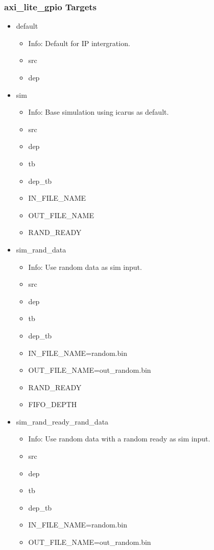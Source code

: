 \subsubsection{axi\_lite\_gpio Targets}
\begin{itemize}
\item default
	\begin{itemize}
	\item[$\space$] Info: Default for IP intergration.
	\item src
	\item dep
	\end{itemize}
\item sim
	\begin{itemize}
	\item[$\space$] Info: Base simulation using icarus as default.
	\item src
	\item dep
	\item tb
	\item dep\_tb
	\item IN\_FILE\_NAME
	\item OUT\_FILE\_NAME
	\item RAND\_READY
	\end{itemize}
\item sim\_rand\_data
	\begin{itemize}
	\item[$\space$] Info: Use random data as sim input.
	\item src
	\item dep
	\item tb
	\item dep\_tb
	\item IN\_FILE\_NAME=random.bin
	\item OUT\_FILE\_NAME=out\_random.bin
	\item RAND\_READY
	\item FIFO\_DEPTH
	\end{itemize}
\item sim\_rand\_ready\_rand\_data
	\begin{itemize}
	\item[$\space$] Info: Use random data with a random ready as sim input.
	\item src
	\item dep
	\item tb
	\item dep\_tb
	\item IN\_FILE\_NAME=random.bin
	\item OUT\_FILE\_NAME=out\_random.bin

\end{itemize}
\end{itemize}
